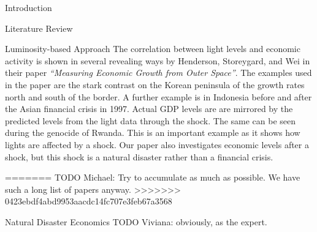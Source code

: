 \documentclass[12pt,fleqn,leqno,letterpaper]{article}
\begin{document}
\begin{section}{Introduction}
\begin{subsection}{Literature Review}
\begin{subsubsection}{Luminosity-based Approach}
      The correlation between light levels and economic activity is shown in several revealing ways by Henderson, Storeygard, and Wei in their paper \textit{``Measuring Economic Growth from Outer Space''}. The examples used in the paper are the stark contrast on the Korean peninsula of the growth rates north and south of the border. A further example is in Indonesia before and after the Asian financial crisis in 1997. Actual GDP levels are are mirrored by the predicted levels from the light data through the shock. The same can be seen during the genocide of Rwanda. This is an important example as it shows how lights are affected by a shock. Our paper also investigates economic levels after a shock, but this shock is a natural disaster rather than a financial crisis. 
 		
      
=======
      TODO Michael: Try to accumulate as much as possible. We have such a long list of papers anyway.
>>>>>>> 0423ebdf4abd9953aacdc14fc707e3feb67a3568
    \end{subsubsection}
    \begin{subsubsection}{Natural Disaster Economics}
      TODO Viviana: obviously, as the expert.
    \end{subsubsection}
  \end{subsection}
\end{section}
\end{document}
